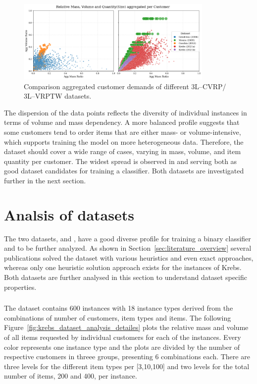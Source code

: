\begin{figure}[ht]
    \centering
    \includegraphics[width=0.85\textwidth]{pictures/comparison_datasets_3lcvrp.png}
    \caption{Comparison aggregated customer demands of different 3L--CVRP/ 3L--VRPTW datasets.}
    \label{fig:dataset_comparison}
\end{figure}

The dispersion of the data points reflects the diversity of individual instances in terms of volume
and mass dependency. A more balanced profile suggests that some customers tend to order items that
are either mass- or volume-intensive, which supports training the model on more heterogeneous data.
Therefore, the dataset should cover a wide range of cases, varying in mass, volume, and item
quantity per customer. The widest spread is observed in \krebsADataSetText and \gendreauDataSetText serving
both as good dataset candidates for training a classifier. Both datasets are investigated further in
the next section.

\section{Analsis of datasets}
\label{sec:analysis_datasets}

The two datasets, \krebsADataSetText and \gendreauDataSetText, have a good diverse profile for training
a binary classifier and to be further analyzed.
As shown in Section~\ref{sec:literature_overview} several publications solved the \gendreauDataSetText dataset
with various heuristics and even exact approaches, whereas only one heuristic solution approach exists for the instances of Krebs.
Both datasets are further analysed in this section to understand dataset specific properties.

\subsubsection{\krebsADataSetText}

The dataset contains 600 instances with 18 instance types derived from the combinations
of number of customers, item types and items. The following Figure~\ref{fig:krebs_dataset_analysis_detailes} plots
the relative mass and volume of all items requested by individual customers for each of the instances. Every color
represents one instance type and the plots are divided by the number of respective customers in threee groups, presenting
6 combinations each. There are three levels for the different item types per [3,10,100] and two levels for the total
number of items, 200 and 400, per instance.

